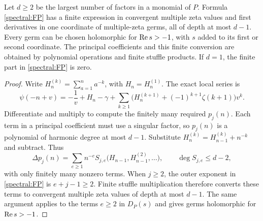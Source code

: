 \begin{theorem}\label{spectral:depth}
Let $d\geq2$ be the largest number of factors in a monomial of $P$.
Formula \eqref{spectral:FP} has a finite expression in convergent multiple
zeta values and first derivatives in one coordinate of multiple-zeta germs,
all of depth at most $d-1$.  Every germ can be chosen holomorphic for
$\operatorname{Re} s>-1$, with $s$ added to its first or second coordinate.
The principal coefficients and this finite conversion
are obtained by polynomial operations and finite stuffle products.
If $d=1$, the finite part in \eqref{spectral:FP} is zero.
\end{theorem}

\begin{proof}
Write $H_n^{(k)}=\sum_{a=1}^na^{-k}$, with $H_n=H_n^{(1)}$.
The exact local series is
\begin{equation}\label{spectral:localH}
 \psi(-n+v)=-\frac1v+H_n-\gamma
   +\sum_{k\geq1}
       \bigl(H_n^{(k+1)}+(-1)^{k+1}\zeta(k+1)\bigr)v^k.
\end{equation}
Differentiate and multiply to compute the finitely many required
$p_j(n)$.  Each term in a principal coefficient must use a singular
factor, so $p_j(n)$ is a polynomial of harmonic degree at most $d-1$.
Substitute $H_n^{(k)}=H_{n-1}^{(k)}+n^{-k}$ and subtract.  Thus
\begin{equation}\label{spectral:differencepoly}
 \Delta p_j(n)=\sum_{e\geq1}n^{-e}
             S_{j,e}\bigl(H_{n-1},H_{n-1}^{(2)},\ldots\bigr),
 \qquad \deg S_{j,e}\leq d-2,
\end{equation}
with only finitely many nonzero terms.  When $j\geq2$, the outer exponent
in \eqref{spectral:FP} is $e+j-1\geq2$.  Finite stuffle multiplication
therefore converts these terms to convergent multiple zeta values of
depth at most $d-1$.  The same argument applies to the terms $e\geq2$
in $D_P(s)$ and gives germs holomorphic for $\operatorname{Re} s>-1$.


\end{proof}
